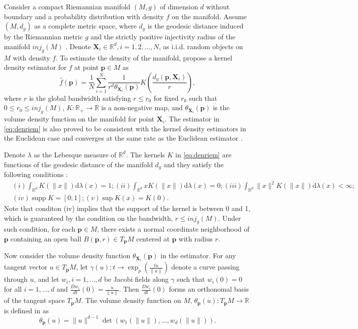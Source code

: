 \documentclass[11pt,a4paper,]{article}
\DeclareMathOperator\supp{supp}
\begin{document}
Consider a compact Riemannian manifold \((M, g)\) of dimension \(d\) without boundary and a probability distribution with density \(f\) on the manifold. Assume \((M, d_g)\) as a complete metric space, where \(d_g\) is the geodesic distance induced by the Riemannian metric \(g\) and the strictly positive injectivity radius of the manifold \(inj_g(M)\) \autocite{Chavel2006-mp}. Denote \(\pmb{X}_i \in \mathbb{R}^d, i = 1, 2, \dots, N\), as i.i.d. random objects on \(M\) with density \(f\). To estimate the density of the manifold, \textcite{Pelletier2005-vu} propose a kernel density estimator for \(f\) at point \(\pmb{p}\in M\) as
\begin{equation}
\label{eq:denriem}
\hat{f}(\pmb{p}) = \frac{1}{N} \sum_{i=1}^{N} \frac{1}{r^d \theta_{\pmb{X}_i}(\pmb{p})} K(\frac{d_g(\pmb{p}, \pmb{X}_i)}{r}),
\end{equation}
where \(r\) is the global bandwidth satisfying \(r \leq r_0\) for fixed \(r_0\) such that \(0\leq r_0\leq inj_g(M)\), \(K: \mathbb{R}_{+} \rightarrow \mathbb{R}\) is a non-negative map, and \(\theta_{\pmb{X}_i}(\pmb{p})\) is the volume density function on the manifold for point \(\pmb{X}_i\). The estimator in \eqref{eq:denriem} is also proved to be consistent with the kernel density estimators in the Euclidean case and converges at the same rate as the Euclidean estimator \autocite{Henry2009-ll}.

Denote \(\lambda\) as the Lebesque measure of \(\mathbb{R}^d\). The kernels \(K\) in \eqref{eq:denriem} are functions of the geodesic distance of the manifold \(d_g\) and they satisfy the following conditions \autocite{Pelletier2005-vu}:
\begin{align}
\label{eq:kernelcondition}
& (i) \int_{\mathbb{R}^{d}} K(\|x\|) \mathrm{d} \lambda(x)=1;
(ii) \int_{\mathbb{R}^{d}} x K(\|x\|) \mathrm{d} \lambda(x)=0;
(iii) \int_{\mathbb{R}^{d}}\|x\|^{2} K(\|x\|) \mathrm{d} \lambda(x)<\infty; \\
& (iv) \supp K=[0; 1];
(v) \sup K(x)=K(0).
\end{align}
Note that conditon (iv) implies that the support of the kernel is between 0 and 1, which is guaranteed by the condition on the bandwidth, \(r\leq inj_g(M)\). Under such condition, for each \(\pmb{p} \in M\), there exists a normal coordinate neighborhood of \(\pmb{p}\) containing an open ball \(B(\pmb{p}, r) \in T_{\pmb{p}}M\) centered at \(\pmb{p}\) with radius \(r\).

Now consider the volume density function \(\theta_{\pmb{X}_i}(\pmb{p})\) in the estimator.
For any tangent vector \(u \in T_{\pmb{p}}M\), let \(\gamma(u): t \rightarrow \exp_p(\frac{tu}{\|u\|})\) denote a curve passing through \(u\), and let \(w_i, i=1,\dots,d\) be Jacobi fields along \(\gamma\) such that \(w_i(0)=0\) for all \(i=1,\dots,d\) and \(\frac{Dw_1}{dt}(0)=\frac{u}{\|u\|}\). Then \(\frac{Dw_i}{dt}(0)\) forms an orthonomal basis of the tangent space \(T_{\pmb{p}}M\).
The volume density function on \(M\), \(\theta_{\pmb{p}}(u): T_{\pmb{p}}M \rightarrow \mathbb{R}\) is defined in \textcite{Le_Brigant2019-lj} as
\begin{equation}
\label{eq:volden}
\theta_{\pmb{p}}(u) = \|u\|^{d-1} \det(w_1(\|u\|),\dots,w_d(\|u\|)).
\end{equation}
\end{document}
